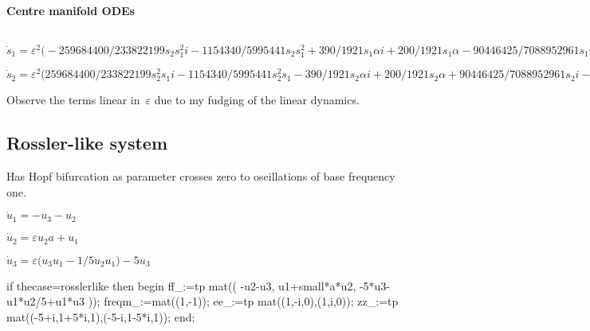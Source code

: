 \documentclass[11pt,a5paper]{article}
\begin{document}
\paragraph{Centre manifold ODEs}
\begin{math}
\end{math}\par

\begin{math}
\dot s_{1}=\varepsilon ^{2} \big(-259684400/233822199 s_{2} s_{1}^{2} i-
1154340/5995441 s_{2} s_{1}^{2}+390/1921 s_{1} \alpha  i+200/1921 s_{1} 
\alpha -90446425/7088952961 s_{1} i-1300360/7088952961 s_{1}\big)+
\varepsilon  \big(-200/1921 s_{1} i+390/1921 s_{1}\big)
\end{math}\par

\begin{math}
\dot s_{2}=\varepsilon ^{2} \big(259684400/233822199 s_{2}^{2} s_{1} i-
1154340/5995441 s_{2}^{2} s_{1}-390/1921 s_{2} \alpha  i+200/1921 s_{2} 
\alpha +90446425/7088952961 s_{2} i-1300360/7088952961 s_{2}\big)+
\varepsilon  \big(200/1921 s_{2} i+390/1921 s_{2}\big)
\end{math}

Observe the terms linear in~\(\varepsilon\) due to my fudging of the linear dynamics.




\subsection{Rossler-like system}
Has Hopf bifurcation as parameter crosses zero to oscillations of base frequency one.
 
 \begin{math}
\dot u_{1}=-u_{3}-u_{2}
\end{math}\par

\begin{math}
\dot u_{2}=\varepsilon  u_{2} a+u_{1}
\end{math}\par

\begin{math}
\dot u_{3}=\varepsilon  \big(u_{3} u_{1}-1/5 u_{2} u_{1}\big)-5 u_{3}
\end{math}

\begin{reduce}
if thecase=rosslerlike then begin
ff_:=tp mat((
    -u2-u3,
    u1+small*a*u2,
    -5*u3-u1*u2/5+u1*u3
    ));
freqm_:=mat((1,-1));
ee_:=tp mat((1,-i,0),(1,i,0));
zz_:=tp mat((-5+i,1+5*i,1),(-5-i,1-5*i,1));
end;
\end{reduce}
\end{document}
